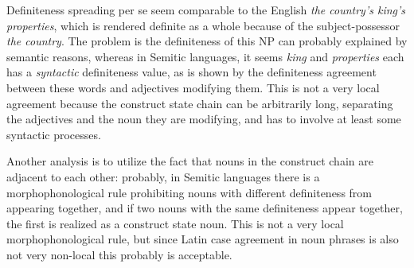 \documentclass[a4paper, oneside, 12pt]{report}
\newcommand{\form}[1]{\emph{#1}}
\begin{document}
Definiteness spreading per se seem comparable to the English \form{the country's king's properties},
which is rendered definite as a whole because of the subject-possessor \form{the country}.
The problem is the definiteness of this NP can probably explained by semantic reasons,
whereas in Semitic languages, it seems \form{king} and \form{properties} each has a \emph{syntactic} definiteness value,
as is shown by the definiteness agreement between these words and adjectives modifying them.
This is not a very local agreement because the construct state chain can be arbitrarily long,
separating the adjectives and the noun they are modifying,
and has to involve at least some syntactic processes.

Another analysis is to utilize the fact that nouns in the construct chain 
are adjacent to each other:
probably, in Semitic languages there is a morphophonological rule 
prohibiting nouns with different definiteness from appearing together,
and if two nouns with the same definiteness appear together,
the first is realized as a construct state noun.
This is not a very local morphophonological rule,
but since Latin case agreement in noun phrases is also not very non-local this probably is acceptable. 



\end{document}
